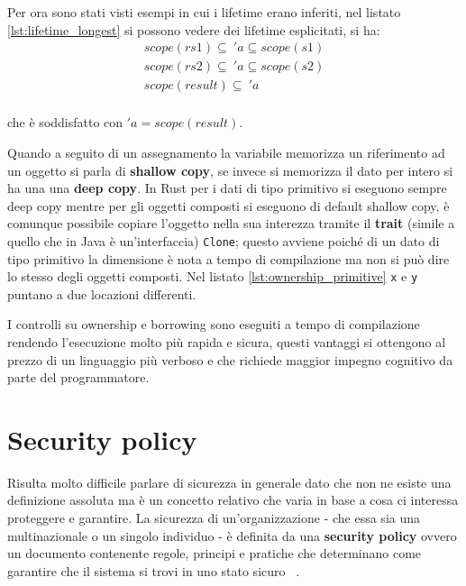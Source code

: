\documentclass[Lau,binding=0.6cm]{sapthesis}
\newcommand{\textcode}[1]{\colorbox{backcolour}{\texttt{#1}}}
\begin{document}
Per ora sono stati visti esempi in cui i lifetime erano inferiti, nel listato \ref{lst:lifetime_longest} si possono vedere dei lifetime esplicitati, si ha:
\begin{align*}
    scope(rs1) \subseteq \ 'a \subseteq scope(s1) \\
    scope(rs2) \subseteq \ 'a \subseteq scope(s2) \\
    scope(result) \subseteq \ 'a \\
\end{align*}

che è soddisfatto con $'a = scope(result) $.




Quando a seguito di un assegnamento la variabile memorizza un riferimento ad un oggetto si parla di \textbf{shallow copy}, se invece si memorizza il dato per intero si ha una una \textbf{deep copy}. 
In Rust per i dati di tipo primitivo si eseguono sempre deep copy mentre per gli oggetti composti si eseguono di default shallow copy, è comunque possibile copiare l'oggetto nella sua interezza tramite il \textbf{trait} (simile a quello che in Java è un'interfaccia) \textcode{Clone}; questo avviene poiché di un dato di tipo primitivo la dimensione è nota a tempo di compilazione ma non si può dire lo stesso degli oggetti composti. Nel listato \ref{lst:ownership_primitive} \textcode{x} e \textcode{y} puntano a due locazioni differenti.



I controlli su ownership e borrowing sono eseguiti a tempo di compilazione rendendo l'esecuzione molto più rapida e sicura, questi vantaggi si ottengono al prezzo di un linguaggio più verboso e che richiede maggior impegno cognitivo da parte del programmatore. 


\chapter{Security policy} \label{chap:security_policy}

Risulta molto difficile parlare di sicurezza in generale dato che non ne esiste una definizione assoluta ma è un concetto relativo che varia in base a cosa ci interessa proteggere e garantire. 
La sicurezza di un'organizzazione - che essa sia una multinazionale o un singolo individuo - è definita da una \textbf{security policy}  ovvero un documento contenente regole, principi e pratiche che determinano come garantire che il sistema si trovi in uno stato sicuro ~\cite{milner:type_polymorphism}. 
\end{document}
